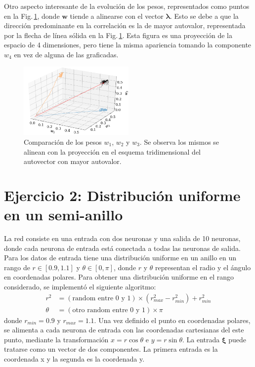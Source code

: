 Otro aspecto interesante de la evolución de los pesos, representados como puntos en la Fig.\,\ref{fig:pesos3D}, donde $\bm w$ tiende a alinearse con el vector $\bm \lambda$. Esto se debe a que la dirección predominante en la correlación es la de mayor autovalor, representada por la flecha de línea sólida en la Fig.\,\ref{fig:pesos3D}. Esta figura es una proyección de la espacio de 4 dimensiones, pero tiene la misma apariencia tomando la componente $w_4$ en vez de alguna de las graficadas.
\begin{figure}[H]
	\centering
	\includegraphics[width=0.5\textwidth]{../Graficos/todos_los_pesos_3D.png}
	\caption{Comparación de los pesos $w_1$, $w_2$ y $w_3$. Se observa los mismos se alinean con la proyección en el esquema tridimensional del autovector con mayor autovalor.}
	\label{fig:pesos3D}
\end{figure}
\section*{Ejercicio 2: Distribución uniforme en un semi-anillo}

La red consiste en una entrada con dos neuronas y una salida de 10 neuronas, donde cada neurona de entrada está conectada a todas las neuronas de salida. Para los datos de entrada tiene una distribución uniforme en un anillo en un rango de $r \in [0.9,1.1]$ y $\theta \in [0,\pi]$, donde $r$ y $\theta$ representan el radio y el ángulo en coordenadas polares. Para obtener una distribución uniforme en el rango considerado, se implementó el siguiente algoritmo:
\begin{align*}
	r^2 &= (\text{random entre 0 y 1})\times(r_{max}^2 - r_{min}^2) + r_{min}^2\\
	\theta &= (\text{otro random entre 0 y 1})\times \pi
\end{align*}
donde $r_{min}=0.9$ y $r_{max}=1.1$. Una vez definido el punto en coordenadas polares, se alimenta a cada neurona de entrada con las coordenadas cartesianas del este punto, mediante la transformación $x = r \cos{\theta} $ e $y = r \sin{\theta}$. La entrada $\bm \xi$ puede tratarse como un vector de dos componentes. La primera entrada es la coordenada x y la segunda es la coordenada y.

